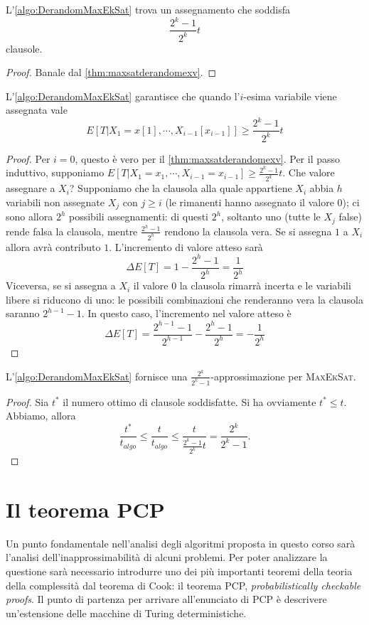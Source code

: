 \begin{theorem}
	L'\cref{algo:DerandomMaxEkSat} trova un assegnamento che soddisfa
	$$
		\frac{2^k -1}{2^k} t
	$$
	clausole.
\end{theorem}
\begin{proof}
	Banale dal \cref{thm:maxsatderandomexv}.
\end{proof}
\begin{lemma}
	L'\cref{algo:DerandomMaxEkSat} garantisce che quando l'$i$-esima variabile
	viene assegnata vale
	$$
		E[T|X_1 = x[1], \cdots, X_{i-1}[x_{i-1}]] \geq \frac{2^k -1}{2^k}t
	$$
\end{lemma}
\begin{proof}
	Per $i = 0$, questo è vero per il \cref{thm:maxsatderandomexv}.
	Per il passo induttivo, supponiamo
	$E[T|X_1 = x_1, \cdots, X_{i-1}= x_{i-1}] \geq \frac{2^k -1}{2^k}t$.
	Che valore assegnare a $X_i$?
	Supponiamo che la clausola alla quale appartiene $X_i$ abbia $h$ variabili
	non assegnate $X_j$ con $j \geq i$ (le rimanenti hanno assegnato il valore $0$);
	ci sono allora $2^h$ possibili assegnamenti:
	di questi $2^h$, soltanto uno (tutte le $X_j$ false) rende falsa la clausola, mentre
	$\frac{2^h - 1}{2^h}$ rendono la clausola vera.
	Se si assegna $1$ a $X_i$ allora avrà contributo $1$. L'incremento di
	valore atteso sarà
	$$
		\Delta E[T] = 1 - \frac{2^h -1}{2^h} = \frac{1}{2^h}
	$$
	Viceversa, se si assegna a $X_i$ il valore $0$ la clausola rimarrà incerta e le
	variabili libere si riducono di uno: le possibili combinazioni che renderanno
	vera la clausola saranno $2^{h-1} -1 $. In questo caso, l'incremento nel valore
	atteso è
	$$
		\Delta E[T] = \frac{2^{h-1} -1}{2^{h-1}}  - \frac{2^h -1}{2^h} = - \frac{1}{2^h}
	$$
\end{proof}
\begin{corollario}
	L'\cref{algo:DerandomMaxEkSat} fornisce una $\frac{2^k}{2^k -1}$-approssimazione per
	\textsc{MaxEkSat}.
\end{corollario}
\begin{proof}
	Sia $t^*$ il numero ottimo di clausole soddisfatte. Si ha ovviamente $t^* \leq t$.
	Abbiamo, allora
	$$
		\frac{t^*}{t_{algo}} \leq \frac{t}{t_{algo}} \leq \frac{t}{\frac{2^k -1}{2^k} t}  = \frac{2^k}{2^k -1}.
	$$
\end{proof}

\section{Il teorema PCP}
Un punto fondamentale nell'analisi degli algoritmi proposta in questo corso sarà
l'analisi dell'inapprossimabilità di alcuni problemi. Per poter analizzare la questione
sarà necessario introdurre uno dei più importanti teoremi della teoria della complessità
dal teorema di Cook: il teorema PCP, \textit{probabilistically checkable proofs}.
Il punto di partenza per arrivare all'enunciato di PCP è descrivere un'estensione delle
macchine di Turing deterministiche.

